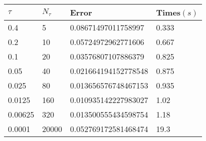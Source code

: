 \begin{tabular}{llll} 
\hline 
$\tau$  & $N_\tau$  &  Error & Times$(s)$  \\ 
\hline \hline 
0.4  & 5 & \num{0.08671497011758997} & 0.333 \\ 
0.2  & 10 & \num{0.05724972962771606} & 0.667 \\ 
0.1  & 20 & \num{0.03576807107886379} & 0.825 \\ 
0.05  & 40 & \num{0.021664194152778548} & 0.875 \\ 
0.025  & 80 & \num{0.013656576748467153} & 0.935 \\ 
0.0125  & 160 & \num{0.010935142227983027} & 1.02 \\ 
0.00625  & 320 & \num{0.013500555434598754} & 1.18 \\ 
0.0001  & 20000 & \num{0.052769172581468474} & 19.3 \\ 
\hline 
\end{tabular} 
